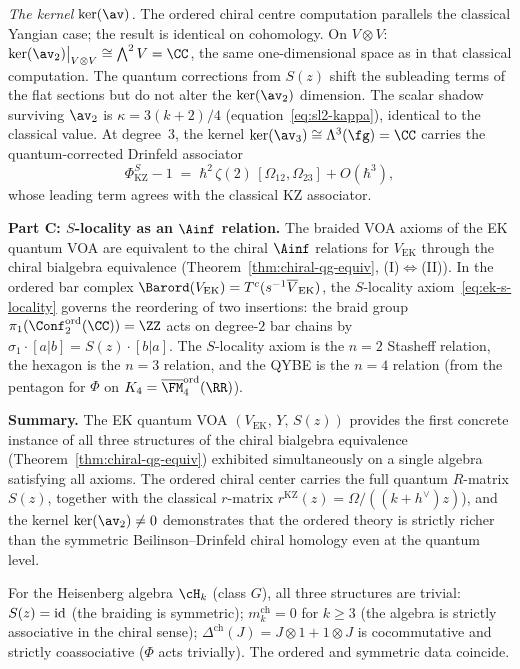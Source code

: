 \begin{example}
\emph{The kernel $\ker(\av)$.}
The ordered chiral centre computation parallels the
classical Yangian case; the result is identical on
cohomology. On $V \otimes V$:
$\ker(\av_2)\big|_{V \otimes V}
\cong \bigwedge^2 V = \CC$,
the same one-dimensional space as in that classical
computation.
The quantum corrections from $S(z)$ shift the subleading
terms of the flat sections but do not alter the
$\ker(\av_2)$ dimension. The scalar shadow surviving
$\av_2$ is $\kappa = 3(k+2)/4$ (equation~\eqref{eq:sl2-kappa}),
identical to the classical value. At degree~$3$, the kernel
$\ker(\av_3) \cong \Lambda^3(\fg) = \CC$ carries the
quantum-corrected Drinfeld associator
\begin{equation}\label{eq:ek-ker-av3}
 \Phi_{\mathrm{KZ}}^S - 1
 \;=\; \hbar^2\,\zeta(2)\,[\Omega_{12}, \Omega_{23}]
 + O(\hbar^3),
\end{equation}
whose leading term agrees with the classical KZ associator.

\medskip
\noindent
\textbf{Part C: $S$-locality as an $\Ainf$ relation.}
The braided VOA axioms of the EK quantum VOA are equivalent
to the chiral $\Ainf$ relations for $V_{\mathrm{EK}}$
through the chiral bialgebra equivalence
(Theorem~\ref{thm:chiral-qg-equiv},
(I)$\Leftrightarrow$(II)).
In the ordered bar complex
$\Barord(V_{\mathrm{EK}}) = T^c(s^{-1}\overline{V}_{\mathrm{EK}})$,
the $S$-locality axiom~\eqref{eq:ek-s-locality} governs the
reordering of two insertions: the braid group
$\pi_1(\Conf_2^{\mathrm{ord}}(\CC)) = \ZZ$ acts on degree-$2$
bar chains by
$\sigma_1 \cdot [a | b] = S(z) \cdot [b | a]$.
The $S$-locality axiom is the $n = 2$ Stasheff relation,
the hexagon is the $n = 3$ relation, and the QYBE is the
$n = 4$ relation (from the pentagon for $\Phi$ on
$K_4 = \overline{\FM}_4^{\mathrm{ord}}(\RR)$).

\medskip
\noindent
\textbf{Summary.}
\noindent
The EK quantum VOA $(V_{\mathrm{EK}},\, Y,\, S(z))$
provides the first concrete instance of all three structures
of the chiral bialgebra equivalence
(Theorem~\ref{thm:chiral-qg-equiv}) exhibited
simultaneously on a single algebra satisfying all axioms.
The ordered chiral center carries the full quantum $R$-matrix
$S(z)$, together with the classical $r$-matrix
$r^{\mathrm{KZ}}(z)=\Omega/((k+h^\vee)z)$), and the kernel
$\ker(\av_2) \neq 0$ demonstrates that the ordered theory
is strictly richer than the symmetric Beilinson--Drinfeld
chiral homology even at the quantum level.
\end{example}

\begin{example}
\label{ex:heis-coproduct}
For the Heisenberg algebra $\cH_k$ (class $G$), all three
structures are trivial:
$S(z) = \mathrm{id}$ (the braiding is symmetric);
$m_k^{\mathrm{ch}} = 0$ for $k \geq 3$ (the algebra is
strictly associative in the chiral sense);
$\Delta^{\mathrm{ch}}(J) = J \otimes 1 + 1 \otimes J$ is
cocommutative and strictly coassociative ($\Phi$ acts
trivially). The ordered and symmetric data coincide.
\end{example}

